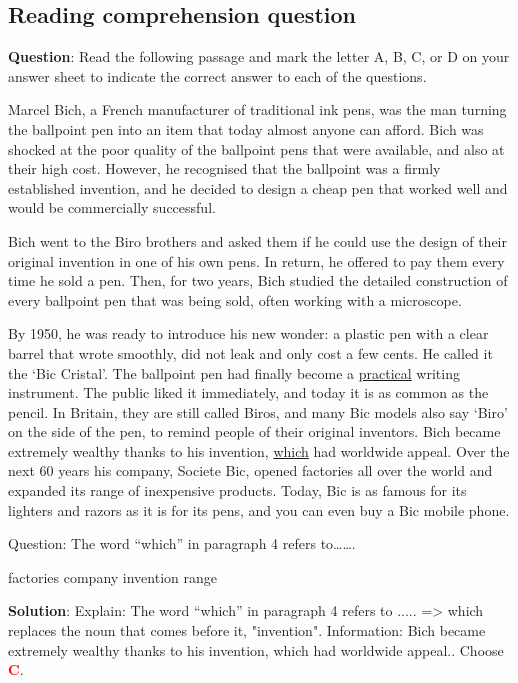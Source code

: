 \documentclass[11pt]{article}
\begin{document}
\subsection{Reading comprehension question}
\label{VNHSGE_Eng_RC}
\begin{mdframed}[linewidth=1pt,linecolor=red] \textbf{Question}: 
	Read the following passage and mark the letter A, B, C, or D on your answer sheet to indicate the correct answer to each of the questions.
	
	Marcel Bich, a French manufacturer of traditional ink pens, was the man turning the ballpoint pen into an item that today almost anyone can afford. Bich was shocked at the poor quality of the ballpoint pens that were available, and also at their high cost. However, he recognised that the ballpoint was a firmly established invention, and he decided to design a cheap pen that worked well and would be commercially successful.
	
	Bich went to the Biro brothers and asked them if he could use the design of their original invention in one of his own pens. In return, he offered to pay them every time he sold a pen. Then, for two years, Bich studied the detailed construction of every ballpoint pen that was being sold, often working with a microscope.
	
	By 1950, he was ready to introduce his new wonder: a plastic pen with a clear barrel that wrote smoothly, did not leak and only cost a few cents. He called it the ‘Bic Cristal’. The ballpoint pen had finally become a \underline{practical} writing instrument. The public liked it immediately, and today it is as common as the pencil. In Britain, they are still called Biros, and many Bic models also say ‘Biro’ on the side of the pen, to remind people of their original inventors. 
	Bich became extremely wealthy thanks to his invention, \underline{which} had worldwide appeal. Over the next 60 years his company, Societe Bic, opened factories all over the world and expanded its range of inexpensive products. Today, Bic is as famous for its lighters and razors as it is for its pens, and you can even buy a Bic mobile phone.
		
	Question: The word “which” in paragraph 4 refers to…….
	\begin{choices}
		\choice factories 
		\choice company 
		\choice invention 
		\choice range
	\end{choices}
	
	\textbf{Solution}: 
	Explain:
	The word “which” in paragraph 4 refers to .....
	=> which replaces the noun that comes before it, "invention".
	Information: Bich became extremely wealthy thanks to his invention, which had worldwide appeal.. Choose \textcolor{red}{\textbf{C}}. 
	

\end{mdframed}
\end{document}
